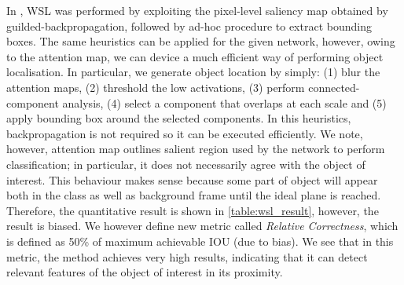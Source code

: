 \documentclass{article}
\begin{document}
In \cite{baumgartner2016real}, WSL was performed by exploiting the pixel-level saliency map obtained by guilded-backpropagation, followed by ad-hoc procedure to extract bounding boxes. The same heuristics can be applied for the given network, however, owing to the attention map, we can device a much efficient way of performing object localisation. In particular, we generate object location by simply: (1) blur the attention maps, (2) threshold the low activations, (3) perform connected-component analysis, (4) select a component that overlaps at each scale and (5) apply bounding box around the selected components. In this heuristics, backpropagation is not required so it can be executed efficiently. We note, however, attention map outlines salient region used by the network to perform classification; in particular, it does not necessarily agree with the object of interest. This behaviour makes sense because some part of object will appear both in the class as well as background frame until the ideal plane is reached. Therefore, the quantitative result is shown in \ref{table:wsl_result}, however, the result is biased. We however define new metric called \emph{Relative Correctness}, which is defined as 50\% of maximum achievable IOU (due to bias). We see that in this metric, the method achieves very high results, indicating that it can detect relevant features of the object of interest in its proximity.

\begin{table}[htb]
\centering
\caption{WSL performance for the proposed strategy with AG-Sononet-FT-16. Correctness (Cor.) is defined as $IOU > 0.5$. Relative Correctness (Rel.) is defined as $IOU > 0.5\times \max(IOU_{class})$. }
\scalebox{1}{
\begin{tabular}{llll}%
\toprule{}   &  IOU Mean (Std) &  Cor. (\%)  &  Rel. (\%) \\ \midrule
Brain (Cb.)  &   0.69 (0.11) &  0.96 & 0.96  \\
Brain (Tv.)  &   0.68 (0.12) &  0.96 & 0.96  \\
Profile      &   0.31 (0.08) &  0.00 & 0.80  \\
Lips         &   0.42 (0.18) &  0.36 & 0.60  \\
Abdominal    &   0.71 (0.10) &  0.96 & 0.96  \\
Kidneys      &   0.73 (0.13) &  0.92 & 0.98  \\
Femur        &   0.31 (0.11) &  0.02 & 0.58  \\
Spine (Cor.) &   0.53 (0.13) &  0.56 & 0.76  \\
Spine (Sag.) &   0.53 (0.11) &  0.54 & 0.94  \\
4CH          &   0.61 (0.14) &  0.76 & 0.86  \\
3VV          &   0.42 (0.14) &  0.34 & 0.62  \\
RVOT         &   0.56 (0.15) &  0.70 & 0.76  \\
LVOT         &   0.54 (0.15) &  0.62 & 0.80  \\
\bottomrule
\end{tabular}}
\label{table:wsl_result}
\end{table}
\end{document}
